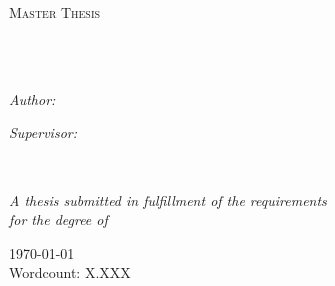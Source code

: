 \documentclass[
12pt, %
oneside, %
english, %
onehalfspacing, %
headsepline, %
]{MastersDoctoralThesis} %
\author{Marco \textsc{Schildt}} %
\begin{document}
\frontmatter %

\pagestyle{plain} %


\begin{titlepage}
\begin{center}

\vspace*{.06\textheight}
{\scshape\LARGE \univname\par}\vspace{1.5cm} %
\textsc{\Large Master Thesis}\\[0.5cm] %

\HRule \\[0.4cm] %
{\huge \bfseries \ttitle\par}\vspace{0.4cm} %
\HRule \\[1.5cm] %
 
\begin{minipage}[t]{0.4\textwidth}
\begin{flushleft} \large
\emph{Author:}\\
{\authorname} %
\end{flushleft}
\end{minipage}
\begin{minipage}[t]{0.4\textwidth}
\begin{flushright} \large
\emph{Supervisor:} \\
{\supname} %
\end{flushright}
\end{minipage}\\[3cm]
 
\vfill

\large \textit{A thesis submitted in fulfillment of the requirements\\ for the degree of \degreename}\\[0.3cm] %
 
\vfill

{\large \today}\\Wordcount: X.XXX\\[4cm] %
 
\vfill
\end{center}
\end{titlepage}
\end{document}
